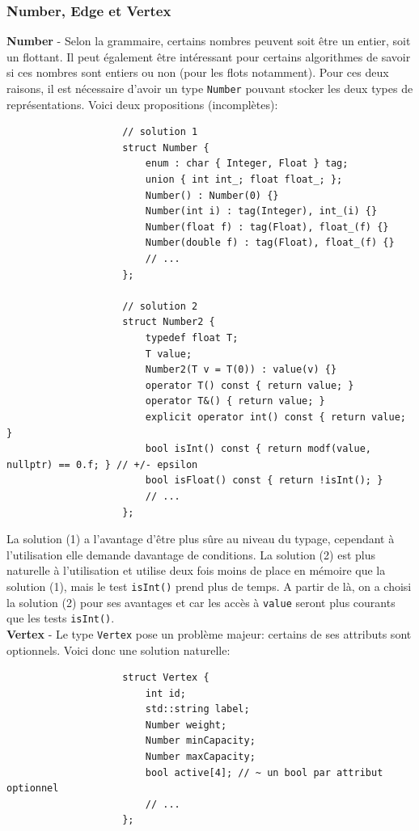\documentclass[french]{article}
\begin{document}
		\subsubsection{Number, Edge et Vertex}
		\label{subsubsec:number-edge-et-vertex}
		\textbf{Number} - Selon la grammaire, certains nombres peuvent soit être un entier, soit un flottant. Il peut également être intéressant pour certains algorithmes de savoir si ces nombres sont entiers ou non (pour les flots notamment). Pour ces deux raisons, il est nécessaire d'avoir un type \texttt{Number} pouvant stocker les deux types de représentations. Voici deux propositions (incomplètes):
		
		\begin{lstlisting}
					// solution 1
					struct Number {
						enum : char { Integer, Float } tag;
						union { int int_; float float_; };
						Number() : Number(0) {}
						Number(int i) : tag(Integer), int_(i) {}
						Number(float f) : tag(Float), float_(f) {}
						Number(double f) : tag(Float), float_(f) {}
						// ...
					};
					
					// solution 2
					struct Number2 {
						typedef float T;
						T value;
						Number2(T v = T(0)) : value(v) {}
						operator T() const { return value; }
						operator T&() { return value; }
						explicit operator int() const { return value; }
						bool isInt() const { return modf(value, nullptr) == 0.f; } // +/- epsilon
						bool isFloat() const { return !isInt(); }
						// ...
					};
		\end{lstlisting}
		
		La solution (1) a l'avantage d'être plus sûre au niveau du typage, cependant à l'utilisation elle demande davantage de conditions. La solution (2) est plus naturelle à l'utilisation et utilise deux fois moins de place en mémoire que la solution (1), mais le test \texttt{isInt()} prend plus de temps. A partir de là, on a choisi la solution (2) pour ses avantages et car les accès à \texttt{value} seront plus courants que les tests \texttt{isInt()}.\\
		
		\textbf{Vertex} - Le type \texttt{Vertex} pose un problème majeur: certains de ses attributs sont optionnels. Voici donc une solution naturelle:
		
		\begin{lstlisting}
					struct Vertex {
						int id;
						std::string label;
						Number weight;
						Number minCapacity;
						Number maxCapacity;
						bool active[4]; // ~ un bool par attribut optionnel
						// ...
					};
		\end{lstlisting}
		
\end{document}
